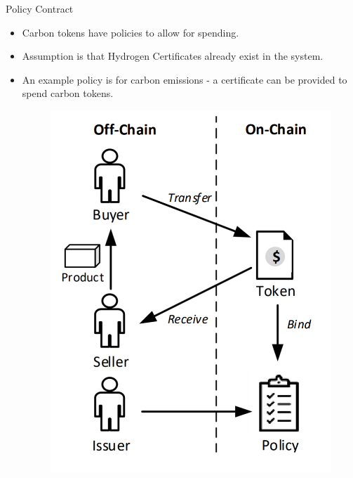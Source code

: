 \begin{frame}{Policy Contract}
    \begin{itemize}
        \item Carbon tokens have policies to allow for spending.
        \item Assumption is that Hydrogen Certificates already exist in the
              system.
        \item An example policy is for carbon emissions - a certificate can be
              provided to spend carbon tokens.
              \begin{figure}
                  \includegraphics[height=0.4\textheight, width=\linewidth,
                      keepaspectratio]{photos/policy.png}
                  \centering
              \end{figure}
    \end{itemize}
\end{frame}
